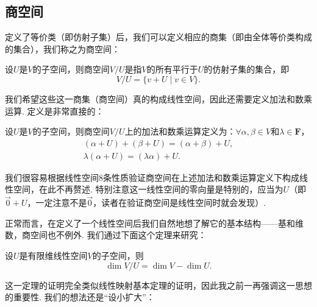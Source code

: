 \subsection{商空间}

定义了等价类（即仿射子集）后，我们可以定义相应的商集（即由全体等价类构成的集合），我们称之为商空间：
\begin{definition}
    设$U$是$V$的子空间，则商空间$V/U$是指$V$的所有平行于$U$的仿射子集的集合，即
    \[V/U=\{v+U \mid v\in V\}.\]
\end{definition}
我们希望这些这一商集（商空间）真的构成线性空间，因此还需要定义加法和数乘运算. 定义是非常直接的：
\begin{definition}
    设$U$是$V$的子空间，则商空间$V/U$上的加法和数乘运算定义为：$\forall \alpha,\beta\in V$和$\lambda\in\mathbf{F}$，
    \begin{gather*}
        (\alpha+U)+(\beta+U)=(\alpha+\beta)+U, \\
        \lambda(\alpha+U)=(\lambda\alpha)+U.
    \end{gather*}
\end{definition}
我们很容易根据线性空间8条性质验证商空间在上述加法和数乘运算定义下构成线性空间，在此不再赘述. 特别注意这一线性空间的零向量是特别的，应当为$U$（即$\vec{0}+U$，一定注意不是$\vec{0}$，读者在验证商空间是线性空间时就会发现）.

正常而言，在定义了一个线性空间后我们自然地想了解它的基本结构——基和维数，商空间也不例外. 我们通过下面这个定理来研究：
\begin{theorem}\label{thm:8:商空间维数}
    设$U$是有限维线性空间$V$的子空间，则
    \[\dim V/U=\dim V-\dim U.\]
\end{theorem}
这一定理的证明完全类似线性映射基本定理的证明，因此我之前一再强调这一思想的重要性. 我们的想法还是``设小扩大''：

